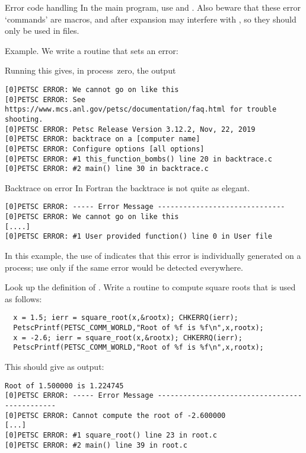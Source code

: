 \begin{fortrannote}{Error code handling}
  In the main program, use  and
  . Also beware that these error `commands' are
  macros, and after expansion may interfere with
  , so they should only be
  used in  files.
\end{fortrannote}

Example. We write a routine that sets an error:

Running this gives, in process~zero, the output
\begin{verbatim}
[0]PETSC ERROR: We cannot go on like this
[0]PETSC ERROR: See https://www.mcs.anl.gov/petsc/documentation/faq.html for trouble shooting.
[0]PETSC ERROR: Petsc Release Version 3.12.2, Nov, 22, 2019
[0]PETSC ERROR: backtrace on a [computer name]
[0]PETSC ERROR: Configure options [all options]
[0]PETSC ERROR: #1 this_function_bombs() line 20 in backtrace.c
[0]PETSC ERROR: #2 main() line 30 in backtrace.c  
\end{verbatim}

\begin{fortrannote}{Backtrace on error}
  In Fortran the backtrace is not quite as elegant.
\begin{verbatim}
[0]PETSC ERROR: ----- Error Message ------------------------------
[0]PETSC ERROR: We cannot go on like this
[....]
[0]PETSC ERROR: #1 User provided function() line 0 in User file
\end{verbatim}
\end{fortrannote}

\begin{remark}
  In this example, the use of  indicates
  that this error is individually generated on a process;
  use  only if the same error would
  be detected everywhere.
\end{remark}

\begin{exercise}
  Look up the definition of .
  Write a routine to compute square roots that is used as follows:
\begin{lstlisting}
  x = 1.5; ierr = square_root(x,&rootx); CHKERRQ(ierr);
  PetscPrintf(PETSC_COMM_WORLD,"Root of %f is %f\n",x,rootx);
  x = -2.6; ierr = square_root(x,&rootx); CHKERRQ(ierr);
  PetscPrintf(PETSC_COMM_WORLD,"Root of %f is %f\n",x,rootx);
\end{lstlisting}
This should give as output:
\begin{verbatim}
Root of 1.500000 is 1.224745
[0]PETSC ERROR: ----- Error Message ----------------------------------------------
[0]PETSC ERROR: Cannot compute the root of -2.600000
[...]
[0]PETSC ERROR: #1 square_root() line 23 in root.c
[0]PETSC ERROR: #2 main() line 39 in root.c
\end{verbatim}

\end{exercise}

